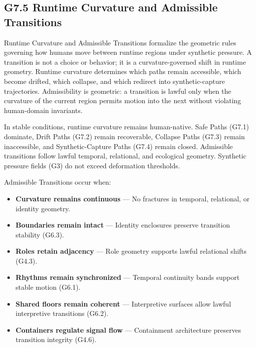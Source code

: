 \subsection*{G7.5 Runtime Curvature and Admissible Transitions}

\noindent Runtime Curvature and Admissible Transitions formalize the geometric
rules governing how humans move between runtime regions under synthetic pressure.
A transition is not a choice or behavior; it is a curvature-governed shift in
runtime geometry. Runtime curvature determines which paths remain accessible,
which become drifted, which collapse, and which redirect into synthetic-capture
trajectories. Admissibility is geometric: a transition is lawful only when the
curvature of the current region permits motion into the next without violating
human-domain invariants.

\medskip

\noindent In stable conditions, runtime curvature remains human-native. Safe
Paths (G7.1) dominate, Drift Paths (G7.2) remain recoverable, Collapse Paths
(G7.3) remain inaccessible, and Synthetic-Capture Paths (G7.4) remain closed.
Admissible transitions follow lawful temporal, relational, and ecological
geometry. Synthetic pressure fields (G3) do not exceed deformation thresholds.

\medskip

\noindent Admissible Transitions occur when:

\begin{itemize}[leftmargin=1.2cm]
    \item \textbf{Curvature remains continuous} — No fractures in temporal,
    relational, or identity geometry.

    \item \textbf{Boundaries remain intact} — Identity enclosures preserve
    transition stability (G6.3).

    \item \textbf{Roles retain adjacency} — Role geometry supports lawful
    relational shifts (G4.3).

    \item \textbf{Rhythms remain synchronized} — Temporal continuity bands
    support stable motion (G6.1).

    \item \textbf{Shared floors remain coherent} — Interpretive surfaces allow
    lawful interpretive transitions (G6.2).

    \item \textbf{Containers regulate signal flow} — Containment architecture
    preserves transition integrity (G4.6).
\end{itemize}

